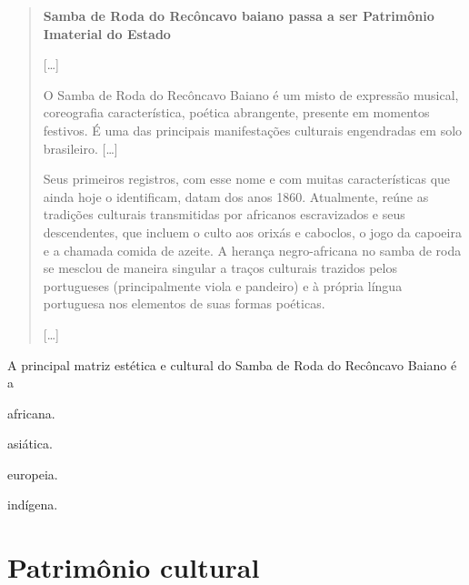 \begin{quote}
\textbf{Samba de Roda do Recôncavo baiano passa a ser Patrimônio Imaterial do Estado}

{[}\ldots{}{]}

O Samba de Roda do Recôncavo Baiano é um misto de expressão musical,
coreografia característica, poética abrangente, presente em momentos
festivos. É uma das principais manifestações culturais engendradas em
solo brasileiro. {[}\ldots{}{]}

Seus primeiros registros, com esse nome e com muitas características que
ainda hoje o identificam, datam dos anos 1860. Atualmente, reúne as
tradições culturais transmitidas por africanos escravizados e seus
descendentes, que incluem o culto aos orixás e caboclos, o jogo da
capoeira e a chamada comida de azeite. A herança negro-africana no samba
de roda se mesclou de maneira singular a traços culturais trazidos pelos
portugueses (principalmente viola e pandeiro) e à própria língua
portuguesa nos elementos de suas formas poéticas.

{[}\ldots{}{]}

\end{quote}

A principal matriz estética e cultural do Samba de Roda do Recôncavo Baiano é a

\begin{minipage}{.5\textwidth}
\begin{escolha}
\item
  africana.
\item
  asiática.
\item
  europeia.
\item
  indígena.
\end{escolha}
\end{minipage}

\chapter{Patrimônio cultural}

